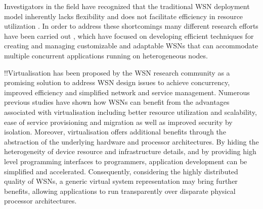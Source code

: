 %


Investigators in the field have recognized that the traditional WSN deployment model inherently lacks flexibility and does not facilitate efficiency in resource utilization \cite{islam2012virtualization}. In order to address these shortcomings many different research efforts have been carried out  \cite{virtual_sensor_networks,Leontiadis:2012:STS:2187181.2187188,Fok:2009:AMA:1552297.1552299}, which have focused on developing efficient techniques for creating and managing customizable and adaptable WSNs that can accommodate multiple concurrent applications running on heterogeneous nodes.  

!!Virtualisation has been proposed by the WSN research community as a promising solution to address WSN design issues \cite{islam2012survey} to achieve concurrency, improved efficiency and simplified network and service management.
Numerous previous studies have shown how WSNs can benefit from the advantages associated with virtualisation \cite{6076694} including better resource utilization and scalability, ease of service provisioning and migration as well as improved security by isolation. Moreover, virtualisation offers additional benefits through the abstraction of the underlying hardware and processor architectures. By hiding the heterogeneity of device resource and infrastructure details, and by providing high level programming interfaces to programmers, application development can be simplified and accelerated. Consequently, considering the highly distributed quality of WSNs, a generic virtual system representation may bring further benefits, allowing applications to run transparently over disparate physical processor architectures.  

